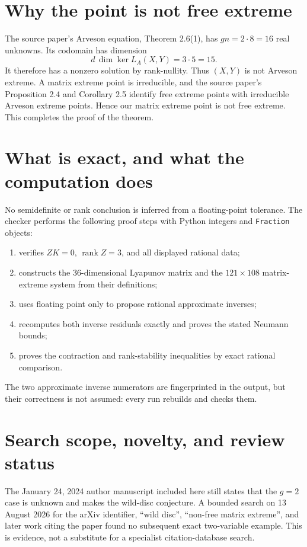 \documentclass[11pt]{article}
\begin{document}
\section{Why the point is not free extreme}

The source paper's Arveson equation, Theorem 2.6(1), has $gn=2\cdot8=16$
real unknowns.  Its codomain has dimension
\[
 d\,\dim\ker L_A(X,Y)=3\cdot5=15.
\]
It therefore has a nonzero solution by rank-nullity.  Thus $(X,Y)$ is not
Arveson extreme.  A matrix extreme point is irreducible, and the source
paper's Proposition 2.4 and Corollary 2.5 identify free extreme points with
irreducible Arveson extreme points.  Hence our matrix extreme point is not
free extreme.  This completes the proof of the theorem.

\section{What is exact, and what the computation does}

No semidefinite or rank conclusion is inferred from a floating-point
tolerance.  The checker performs the following proof steps with Python
integers and \texttt{Fraction} objects:
\begin{enumerate}[leftmargin=2em]
\item verifies $ZK=0$, $\operatorname{rank}Z=3$, and all displayed rational
data;
\item constructs the 36-dimensional Lyapunov matrix and the
$121\times108$ matrix-extreme system from their definitions;
\item uses floating point only to propose rational approximate inverses;
\item recomputes both inverse residuals exactly and proves the stated
Neumann bounds;
\item proves the contraction and rank-stability inequalities by exact
rational comparison.
\end{enumerate}
The two approximate inverse numerators are fingerprinted in the output, but
their correctness is not assumed: every run rebuilds and checks them.

\section{Search scope, novelty, and review status}

The January 24, 2024 author manuscript included here still states that the
$g=2$ case is unknown and makes the wild-disc conjecture.  A bounded search
on 13 August 2026 for the arXiv identifier, ``wild disc'', ``non-free matrix
extreme'', and later work citing the paper found no subsequent exact
two-variable example.  This is evidence, not a substitute for a specialist
citation-database search.
\end{document}
